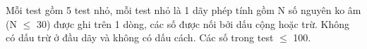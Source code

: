 Mỗi test gồm 5 test nhỏ, mỗi test nhỏ là 1 dãy phép tính gồm N số nguyên ko âm (N  $\le$  30) được ghi trên 1 dòng, các số được nối bởi dấu cộng hoặc trừ. Không có dấu trừ ở đầu dãy và không có dấu cách. Các số trong test  $\le$  100.